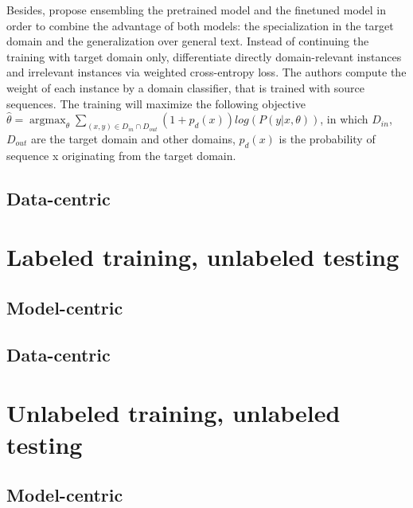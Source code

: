  Besides, \cite{Freitag16fast} propose ensembling the pretrained model and the finetuned model in order to combine the advantage of both models: the specialization in the target domain and the generalization over general text. Instead of continuing the training with target domain only, \cite{Chen17cost} differentiate directly domain-relevant instances and irrelevant instances via weighted cross-entropy loss. The authors compute the weight of each instance by a domain classifier, that is trained with source sequences. The training will maximize the following objective $\hat{\theta} = \displaystyle{\mathop{\arg max}_{\theta} \mathop{\sum}_{(x,y)\in D_{in} \cap D_{out}}} (1+p_d(x))log(P(y|x,\theta))$, in which $D_{in}$, $D_{out}$ are the target domain and other domains, $p_d(x)$ is the probability of sequence x originating from the target domain. 

\subsection{Data-centric}
\label{ssec:case-2-data}

\section{Labeled training, unlabeled testing}
\label{sec:case3}
\subsection{Model-centric}

\subsection{Data-centric}

\section{Unlabeled training, unlabeled testing}
\label{sec:case4}
\subsection{Model-centric}

